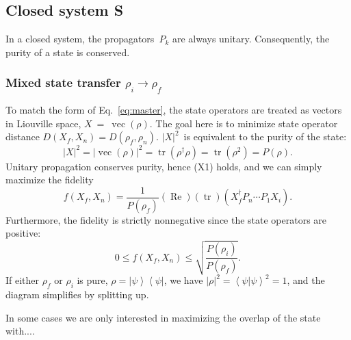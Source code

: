\documentclass[aps, pra, a4paper, longbibliography]{revtex4}
\newcommand{\be}{\begin{equation}}
\newcommand{\ee}{\end{equation}}
\newcommand{\braket}[2]{\left \langle #1 | #2 \right \rangle}
\newcommand{\ketbra}[2]{\left| #1 \right \rangle \left \langle #2 \right|}
\DeclareMathOperator{\tr}{tr}
\DeclareMathOperator{\re}{Re}
\DeclareMathOperator{\cvec}{vec}
\newcommand{\dd}[2]{\frac{\partial #1}{\partial #2}}
\begin{document}



\subsection{Closed system S}

In a closed system, the propagators~$P_k$ are always
unitary. Consequently, the purity of a state is conserved.


\subsubsection{Mixed state transfer $\rho_i \to \rho_f$}
\label{sec:closed-mixed}

To match the form of Eq.~\eqref{eq:master},
the state operators are treated as vectors in Liouville space, $X~=~\cvec(\rho)$.
The goal here is to minimize state operator distance
$D(X_f, X_n) = D(\rho_f, \rho_n)$.
$|X|^2$~is equivalent to the purity of the state:
\be
|X|^2
= |\cvec(\rho)|^2
= \tr(\rho^\dagger \rho)
= \tr(\rho^2)
= P(\rho).
\ee
Unitary propagation conserves purity, hence (X1) holds, and we can
simply maximize the fidelity
\be
f(X_f, X_n)
= \frac{1}{P(\rho_f)} (\re) (\tr) \left( X_f^\dagger  P_n \cdots P_1 X_i \right).
\ee
Furthermore, the fidelity is strictly nonnegative since the
state operators are positive:
\be
0 \le f(X_f, X_n) \le \sqrt{\frac{P(\rho_i)}{P(\rho_f)}}.
\ee
If either $\rho_f$ or $\rho_i$ is pure,
$\rho = \ketbra{\psi}{\psi}$,
we have $|\rho|^2 = \braket{\psi}{\psi}^2 = 1$, and
the diagram simplifies by splitting up.


In some cases we are only interested in maximizing the overlap of the state with....
\end{document}
